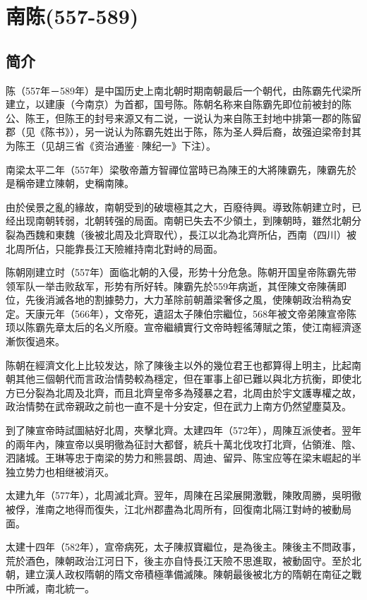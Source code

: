 

\section{南陈\tiny(557-589)}

\subsection{简介}

陈（557年－589年）是中国历史上南北朝时期南朝最后一个朝代，由陈霸先代梁所建立，以建康（今南京）为首都，国号陈。陈朝名称来自陈霸先即位前被封的陈公、陈王，但陈王的封号来源又有二说，一说认为来自陈王封地中排第一郡的陈留郡（见《陈书》），另一说认为陈霸先姓出于陈，陈为圣人舜后裔，故强迫梁帝封其为陈王（见胡三省《资治通鉴·陳纪一》下注）。

南梁太平二年（557年）梁敬帝蕭方智禪位當時已為陳王的大將陳霸先，陳霸先於是稱帝建立陳朝，史稱南陳。

由於侯景之亂的緣故，南朝受到的破壞極其之大，百廢待興。導致陈朝建立时，已经出现南朝转弱，北朝转强的局面。南朝已失去不少領土，到陳朝時，雖然北朝分裂為西魏和東魏（後被北周及北齊取代），長江以北為北齊所佔，西南（四川）被北周所佔，只能靠長江天險維持南北對峙的局面。

陈朝刚建立时（557年）面临北朝的入侵，形势十分危急。陈朝开国皇帝陈霸先带领军队一举击败敌军，形势有所好转。陳霸先於559年病逝，其侄陳文帝陳蒨即位，先後消滅各地的割據勢力，大力革除前朝蕭梁奢侈之風，使陳朝政治稍為安定。天康元年（566年），文帝死，遺詔太子陳伯宗繼位，568年被文帝弟陳宣帝陈顼以陈霸先章太后的名义所廢。宣帝繼續實行文帝時輕徭薄賦之策，使江南經濟逐漸恢復過來。

陈朝在經濟文化上比较发达，除了陳後主以外的幾位君王也都算得上明主，比起南朝其他三個朝代而言政治情勢較為穩定，但在軍事上卻已難以與北方抗衡，即使北方已分裂為北周及北齊，而且北齊皇帝多為殘暴之君，北周由於宇文護專權之故，政治情勢在武帝親政之前也一直不是十分安定，但在武力上南方仍然望塵莫及。

到了陳宣帝時試圖結好北周，夾擊北齊。太建四年（572年），周陳互派使者。翌年的兩年內，陳宣帝以吳明徹為征討大都督，統兵十萬北伐攻打北齊，佔領淮、陰、泗諸城。王琳等忠于南梁的势力和熊昙朗、周迪、留异、陈宝应等在梁末崛起的半独立势力也相继被消灭。

太建九年（577年），北周滅北齊。翌年，周陳在呂梁展開激戰，陳敗周勝，吳明徹被俘，淮南之地得而復失，江北州郡盡為北周所有，回復南北隔江對峙的被動局面。

太建十四年（582年），宣帝病死，太子陳叔寶繼位，是為後主。陳後主不問政事，荒於酒色，陳朝政治江河日下，後主亦自恃長江天險不思進取，被動固守。至於北朝，建立漢人政权隋朝的隋文帝積極準備滅陳。陳朝最後被北方的隋朝在南征之戰中所滅，南北統一。

